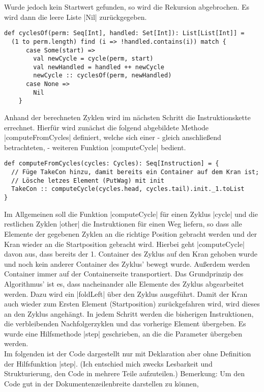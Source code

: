 Wurde jedoch kein Startwert gefunden, so wird die Rekursion abgebrochen.
Es wird dann die leere Liste |Nil| zurückgegeben.
\lstset{language=Scala}
\lstset{basicstyle=\ttfamily\normalsize}
\begin{lstlisting}
def cyclesOf(perm: Seq[Int], handled: Set[Int]): List[List[Int]] =
  (1 to perm.length) find (i => !handled.contains(i)) match {
      case Some(start) =>
        val newCycle = cycle(perm, start)
        val newHandled = handled ++ newCycle
        newCycle :: cyclesOf(perm, newHandled)
      case None =>
        Nil
    }
\end{lstlisting}
Anhand der berechneten Zyklen wird im nächsten Schritt die Instruktionskette errechnet.
Hierfür wird zunächst die folgend abgebildete Methode |computeFromCycles| definiert,
welche sich einer - gleich anschließend betrachteten, - weiteren Funktion |computeCycle| bedient.
\lstset{basicstyle=\ttfamily\small}
\begin{lstlisting}
def computeFromCycles(cycles: Cycles): Seq[Instruction] = {
  // Füge TakeCon hinzu, damit bereits ein Container auf dem Kran ist;
  // Lösche letzes Element (PutWag) mit init
  TakeCon :: computeCycle(cycles.head, cycles.tail).init._1.toList
}
\end{lstlisting}
Im Allgemeinen soll die Funktion |computeCycle| für einen Zyklus |cycle| und die restlichen Zyklen |other| die Instruktionen für einen Weg liefern,
so dass alle Elemente der gegebenen Zyklen an die richtige Position gebracht werden und der Kran wieder an die Startposition gebracht wird.
Hierbei geht |computeCycle| davon aus, dass bereits der 1. Container des Zyklus auf den Kran gehoben wurde und noch kein anderer Container des Zyklus' bewegt wurde.
Außerdem werden Container immer auf der Containerseite transportiert.
Das Grundprinzip des Algorithmus' ist es, dass nacheinander alle Elemente des Zyklus abgearbeitet werden.
Dazu wird ein |foldLeft| über den Zyklus ausgeführt.
Damit der Kran auch wieder zum Ersten Element (Startposition) zurückgefahren wird, wird dieses an den Zyklus angehängt.
In jedem Schritt werden die bisherigen Instruktionen, die verbleibenden Nachfolgerzyklen und das vorherige Element übergeben.
Es wurde eine Hilfsmethode |step| geschrieben, an die die Parameter übergeben werden. \\
Im folgenden ist der Code dargestellt nur mit Deklaration aber ohne Definition der Hilfsfunktion |step|.
(Ich entschied mich zwecks Lesbarkeit und Strukturierung, den Code in mehrere Teile aufzuteilen.)
Bemerkung: Um den Code gut in der Dokumentenzeilenbreite darstellen zu können,
